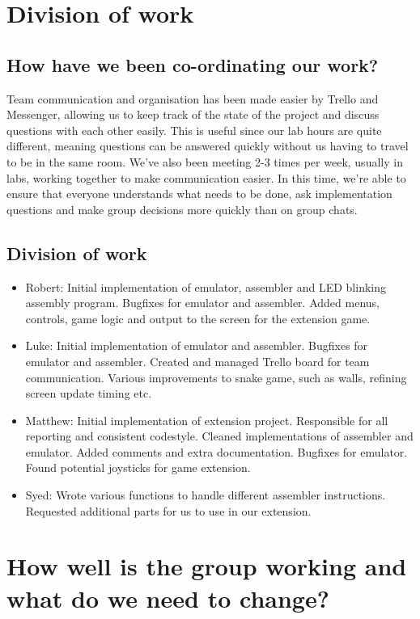 \documentclass[12pt,twoside]{article}
\begin{document}

\section{Division of work}
\subsection{How have we been co-ordinating our work?}
Team communication and organisation has been made easier by Trello and Messenger, allowing us to keep track of the state of the project and discuss questions with each other easily. This is useful since our lab hours are quite different, meaning questions can be answered quickly without us having to travel to be in the same room. We've also been meeting 2-3 times per week, usually in labs, working together to make communication easier. In this time, we're able to ensure that everyone understands what needs to be done, ask implementation questions and make group decisions more quickly than on group chats.\\
\subsection{Division of work}
\begin{itemize}
\item Robert: Initial implementation of emulator, assembler and LED blinking assembly program. Bugfixes for emulator and assembler. Added menus, controls, game logic and output to the screen for the extension game.
\item Luke: Initial implementation of emulator and assembler. Bugfixes for emulator and assembler. Created and managed Trello board for team communication. Various improvements to snake game, such as walls, refining screen update timing etc.
\item Matthew: Initial implementation of extension project. Responsible for all reporting and consistent codestyle. Cleaned implementations of assembler and emulator. Added comments and extra documentation. Bugfixes for emulator. Found potential joysticks for game extension.
\item Syed: Wrote various functions to handle different assembler instructions. Requested additional parts for us to use in our extension.
\end{itemize}
\section{How well is the group working and what do we need to change?}
\end{document}
